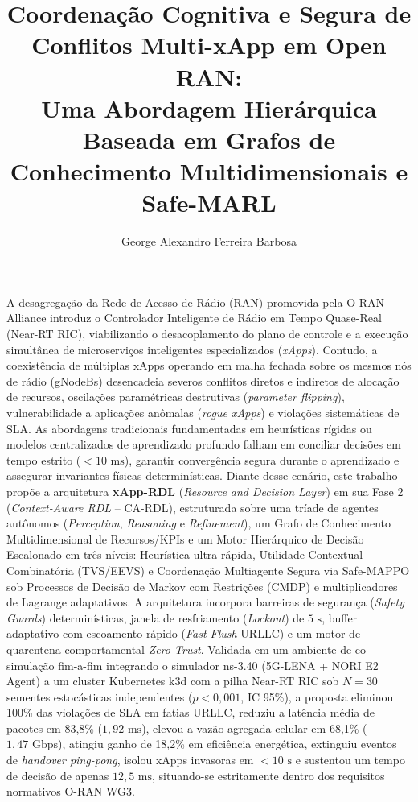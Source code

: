 \documentclass[12pt]{article}
\title{Coordenação Cognitiva e Segura de Conflitos Multi-xApp em Open RAN:\\Uma Abordagem Hierárquica Baseada em Grafos de Conhecimento Multidimensionais e Safe-MARL}
\author{George Alexandro Ferreira Barbosa\inst{1}}
\begin{document}
\maketitle

\begin{resumo}
A desagregação da Rede de Acesso de Rádio (RAN) promovida pela O-RAN Alliance introduz o Controlador Inteligente de Rádio em Tempo Quase-Real (Near-RT RIC), viabilizando o desacoplamento do plano de controle e a execução simultânea de microserviços inteligentes especializados (\textit{xApps}). Contudo, a coexistência de múltiplas xApps operando em malha fechada sobre os mesmos nós de rádio (gNodeBs) desencadeia severos conflitos diretos e indiretos de alocação de recursos, oscilações paramétricas destrutivas (\textit{parameter flipping}), vulnerabilidade a aplicações anômalas (\textit{rogue xApps}) e violações sistemáticas de SLA. As abordagens tradicionais fundamentadas em heurísticas rígidas ou modelos centralizados de aprendizado profundo falham em conciliar decisões em tempo estrito ($<10\text{ ms}$), garantir convergência segura durante o aprendizado e assegurar invariantes físicas determinísticas. Diante desse cenário, este trabalho propõe a arquitetura \textbf{xApp-RDL} (\textit{Resource and Decision Layer}) em sua Fase 2 (\textit{Context-Aware RDL} -- CA-RDL), estruturada sobre uma tríade de agentes autônomos (\textit{Perception}, \textit{Reasoning} e \textit{Refinement}), um Grafo de Conhecimento Multidimensional de Recursos/KPIs e um Motor Hierárquico de Decisão Escalonado em três níveis: Heurística ultra-rápida, Utilidade Contextual Combinatória (TVS/EEVS) e Coordenação Multiagente Segura via Safe-MAPPO sob Processos de Decisão de Markov com Restrições (CMDP) e multiplicadores de Lagrange adaptativos. A arquitetura incorpora barreiras de segurança (\textit{Safety Guards}) determinísticas, janela de resfriamento (\textit{Lockout}) de $5\text{ s}$, buffer adaptativo com escoamento rápido (\textit{Fast-Flush} URLLC) e um motor de quarentena comportamental \textit{Zero-Trust}. Validada em um ambiente de co-simulação fim-a-fim integrando o simulador ns-3.40 (5G-LENA + NORI E2 Agent) a um cluster Kubernetes k3d com a pilha Near-RT RIC sob $N=30$ sementes estocásticas independentes ($p < 0,001$, IC 95\%), a proposta eliminou 100\% das violações de SLA em fatias URLLC, reduziu a latência média de pacotes em 83,8\% ($1,92\text{ ms}$), elevou a vazão agregada celular em 68,1\% ($1,47\text{ Gbps}$), atingiu ganho de 18,2\% em eficiência energética, extinguiu eventos de \textit{handover ping-pong}, isolou xApps invasoras em $<10\text{ s}$ e sustentou um tempo de decisão de apenas $12,5\text{ ms}$, situando-se estritamente dentro dos requisitos normativos O-RAN WG3.
\end{resumo}
\end{document}
